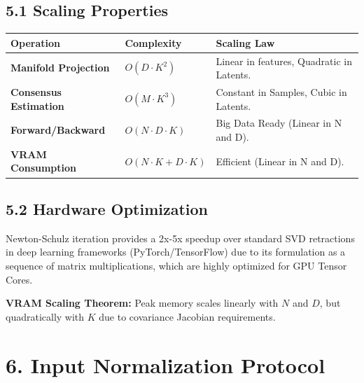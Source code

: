 \documentclass[
  letterpaper,
]{report}
\newcounter{none} %
\begin{document}
\subsection{5.1 Scaling Properties}\label{scaling-properties}

{\def\LTcaptype{none} %
\begin{longtable}[]{@{}
  >{\raggedright\arraybackslash}p{}
  >{\raggedright\arraybackslash}p{}
  >{\raggedright\arraybackslash}p{}@{}}
\toprule\noalign{}
\begin{minipage}[b]{\linewidth}\raggedright
Operation
\end{minipage} & \begin{minipage}[b]{\linewidth}\raggedright
Complexity
\end{minipage} & \begin{minipage}[b]{\linewidth}\raggedright
Scaling Law
\end{minipage} \\
\midrule\noalign{}
\endhead
\bottomrule\noalign{}
\endlastfoot
\textbf{Manifold Projection} & \(O(D \cdot K^2)\) & Linear in features,
Quadratic in Latents. \\
\textbf{Consensus Estimation} & \(O(M \cdot K^3)\) & Constant in
Samples, Cubic in Latents. \\
\textbf{Forward/Backward} & \(O(N \cdot D \cdot K)\) & Big Data Ready
(Linear in N and D). \\
\textbf{VRAM Consumption} & \(O(N \cdot K + D \cdot K)\) & Efficient
(Linear in N and D). \\
\end{longtable}
}

\subsection{5.2 Hardware Optimization}\label{hardware-optimization}

Newton-Schulz iteration provides a 2x-5x speedup over standard SVD
retractions in deep learning frameworks (PyTorch/TensorFlow) due to its
formulation as a sequence of matrix multiplications, which are highly
optimized for GPU Tensor Cores.

\textbf{VRAM Scaling Theorem:} Peak memory scales linearly with \(N\)
and \(D\), but quadratically with \(K\) due to covariance Jacobian
requirements.

\section{6. Input Normalization
Protocol}\label{input-normalization-protocol}
\end{document}
